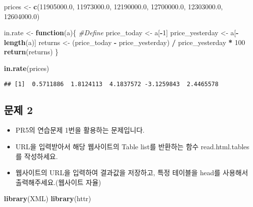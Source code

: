 \documentclass[
]{article}
\newenvironment{Shaded}{\begin{snugshade}}{\end{snugshade}}
\newcommand{\CommentTok}[1]{\textcolor[rgb]{0.56,0.35,0.01}{\textit{#1}}}
\newcommand{\ControlFlowTok}[1]{\textcolor[rgb]{0.13,0.29,0.53}{\textbf{#1}}}
\newcommand{\DecValTok}[1]{\textcolor[rgb]{0.00,0.00,0.81}{#1}}
\newcommand{\FloatTok}[1]{\textcolor[rgb]{0.00,0.00,0.81}{#1}}
\newcommand{\KeywordTok}[1]{\textcolor[rgb]{0.13,0.29,0.53}{\textbf{#1}}}
\newcommand{\NormalTok}[1]{#1}
\newcommand{\OperatorTok}[1]{\textcolor[rgb]{0.81,0.36,0.00}{\textbf{#1}}}
\newcommand{\StringTok}[1]{\textcolor[rgb]{0.31,0.60,0.02}{#1}}
\providecommand{\tightlist}{%
  \setlength{\itemsep}{0pt}\setlength{\parskip}{0pt}}
\begin{document}
\begin{Shaded}
\begin{Highlighting}[]
\NormalTok{prices <-}\StringTok{ }\KeywordTok{c}\NormalTok{(}\FloatTok{11905000.0}\NormalTok{, }\FloatTok{11973000.0}\NormalTok{, }\FloatTok{12190000.0}\NormalTok{, }\FloatTok{12700000.0}\NormalTok{, }\FloatTok{12303000.0}\NormalTok{, }\FloatTok{12604000.0}\NormalTok{)}

\NormalTok{in.rate <-}\StringTok{ }\ControlFlowTok{function}\NormalTok{(a)\{             }\CommentTok{#Define}
\NormalTok{  price_today <-}\StringTok{ }\NormalTok{a[}\OperatorTok{-}\DecValTok{1}\NormalTok{]}
\NormalTok{  price_yesterday <-}\StringTok{ }\NormalTok{a[}\OperatorTok{-}\KeywordTok{length}\NormalTok{(a)]}
\NormalTok{  returns <-}\StringTok{ }\NormalTok{(price_today }\OperatorTok{-}\StringTok{ }\NormalTok{price_yesterday) }\OperatorTok{/}\StringTok{ }\NormalTok{price_yesterday }\OperatorTok{*}\StringTok{ }\DecValTok{100}
  \KeywordTok{return}\NormalTok{(returns)}
\NormalTok{\}}

\KeywordTok{in.rate}\NormalTok{(prices)}
\end{Highlighting}
\end{Shaded}

\begin{verbatim}
## [1]  0.5711886  1.8124113  4.1837572 -3.1259843  2.4465578
\end{verbatim}

\hypertarget{uxbb38uxc81c-2}{%
\subsection{문제 2}\label{uxbb38uxc81c-2}}

\begin{itemize}
\tightlist
\item
  PR5의 연습문제 1번을 활용하는 문제입니다.
\item
  URL을 입력받아서 해당 웹사이트의 Table list를 반환하는 함수
  read.html.tables를 작성하세요.
\item
  웹사이트의 URL을 입력하여 결과값을 저장하고, 특정 테이블을 head를
  사용해서 출력해주세요.(웹사이트 자율)
\end{itemize}

\begin{Shaded}
\begin{Highlighting}[]
  \KeywordTok{library}\NormalTok{(XML)}
  \KeywordTok{library}\NormalTok{(httr)}
\end{Highlighting}
\end{Shaded}
\end{document}
